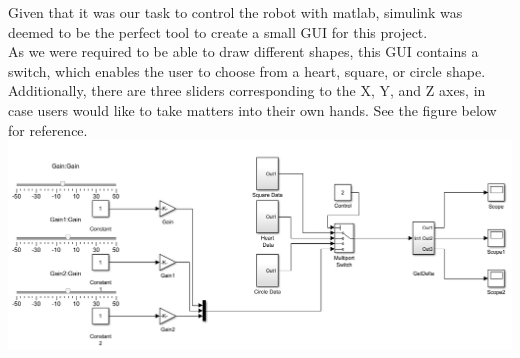 Given that it was our task to control the robot with matlab, simulink was deemed to be the perfect tool to create a small GUI for this project.\\
As we were required to be able to draw different shapes, this GUI contains a switch, which enables the user to choose from a heart, square, or circle shape. Additionally, there are three sliders corresponding to the X, Y, and Z axes, in case users would like to take matters into their own hands. See the figure below for reference.\\
\includegraphics[scale=.4]{images/simulink_gui.png}